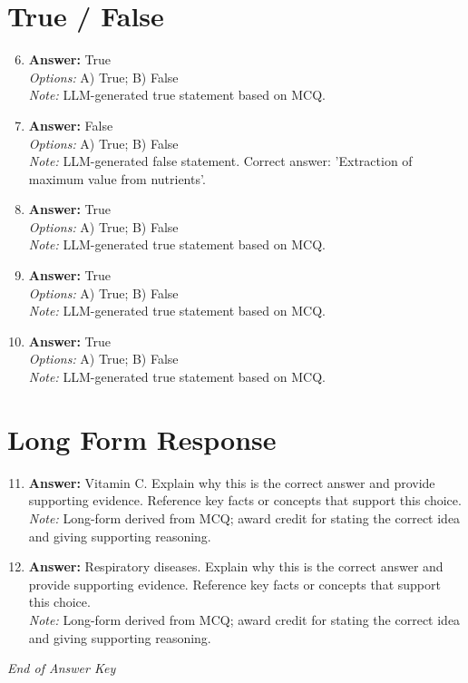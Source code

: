 \documentclass[12pt]{article}
\begin{document}
\section*{True / False}
\begin{enumerate}[label=\arabic*.]
\setcounter{enumi}{5}
\item \textbf{Answer:} True
\\ \textit{Options:} A) True; B) False
\\ \textit{Note:} LLM-generated true statement based on MCQ.
\item \textbf{Answer:} False
\\ \textit{Options:} A) True; B) False
\\ \textit{Note:} LLM-generated false statement. Correct answer: 'Extraction of maximum value from nutrients'.
\item \textbf{Answer:} True
\\ \textit{Options:} A) True; B) False
\\ \textit{Note:} LLM-generated true statement based on MCQ.
\item \textbf{Answer:} True
\\ \textit{Options:} A) True; B) False
\\ \textit{Note:} LLM-generated true statement based on MCQ.
\item \textbf{Answer:} True
\\ \textit{Options:} A) True; B) False
\\ \textit{Note:} LLM-generated true statement based on MCQ.
\end{enumerate}

\section*{Long Form Response}
\begin{enumerate}[label=\arabic*.]
\setcounter{enumi}{10}
\item \textbf{Answer:} Vitamin C. Explain why this is the correct answer and provide supporting evidence. Reference key facts or concepts that support this choice.
\\ \textit{Note:} Long-form derived from MCQ; award credit for stating the correct idea and giving supporting reasoning.
\item \textbf{Answer:} Respiratory diseases. Explain why this is the correct answer and provide supporting evidence. Reference key facts or concepts that support this choice.
\\ \textit{Note:} Long-form derived from MCQ; award credit for stating the correct idea and giving supporting reasoning.
\end{enumerate}

\vfill
\noindent\textit{End of Answer Key}
\end{document}

